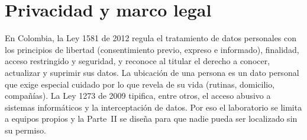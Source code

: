 \section{Privacidad y marco legal}
En Colombia, la Ley 1581 de 2012 \cite{ley1581} regula el tratamiento de datos personales con los principios de libertad (consentimiento previo, expreso e informado), finalidad, acceso restringido y seguridad, y reconoce al titular el derecho a conocer, actualizar y suprimir sus datos. La ubicación de una persona es un dato personal que exige especial cuidado por lo que revela de su vida (rutinas, domicilio, compañías). La Ley 1273 de 2009 \cite{ley1273} tipifica, entre otros, el acceso abusivo a sistemas informáticos y la interceptación de datos. Por eso el laboratorio se limita a equipos propios y la Parte~II se diseña para que nadie pueda ser localizado sin su permiso.
